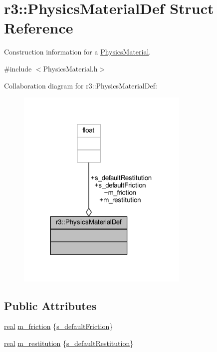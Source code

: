 \hypertarget{structr3_1_1_physics_material_def}{}\section{r3\+:\+:Physics\+Material\+Def Struct Reference}
\label{structr3_1_1_physics_material_def}


Construction information for a \mbox{\hyperlink{classr3_1_1_physics_material}{Physics\+Material}}.  




{\ttfamily \#include $<$Physics\+Material.\+h$>$}



Collaboration diagram for r3\+:\+:Physics\+Material\+Def\+:\nopagebreak
\begin{figure}[H]
\begin{center}
\leavevmode
\includegraphics[width=233pt]{structr3_1_1_physics_material_def__coll__graph}
\end{center}
\end{figure}
\subsection*{Public Attributes}
\begin{DoxyCompactItemize}
\item 
\mbox{\hyperlink{namespacer3_ab2016b3e3f743fb735afce242f0dc1eb}{real}} \mbox{\hyperlink{structr3_1_1_physics_material_def_aef82d9585791c1470ab92c6efa57b1b9}{m\+\_\+friction}} \{\mbox{\hyperlink{structr3_1_1_physics_material_def_a491a5e29b693bd20a7a8708f13c7f473}{s\+\_\+default\+Friction}}\}
\item 
\mbox{\hyperlink{namespacer3_ab2016b3e3f743fb735afce242f0dc1eb}{real}} \mbox{\hyperlink{structr3_1_1_physics_material_def_abf6dd41075d432324d9524e18f041a87}{m\+\_\+restitution}} \{\mbox{\hyperlink{structr3_1_1_physics_material_def_a994308068cb88f266dd5f9f63f320add}{s\+\_\+default\+Restitution}}\}
\end{DoxyCompactItemize}
